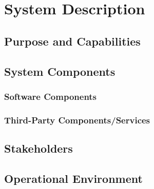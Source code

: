 \documentclass{article}
\begin{document}
\section{System Description}
\subsection{Purpose and Capabilities}
\subsection{System Components}
\subsubsection{Software Components}
\subsubsection{Third-Party Components/Services}
\subsection{Stakeholders}
\subsection{Operational Environment}
\end{document}
